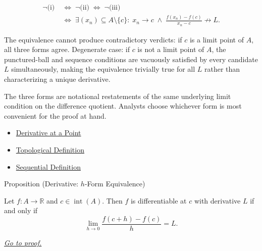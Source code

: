 \begin{remark*}
\[
\begin{aligned}
\neg\text{(i)} &\;\Longleftrightarrow\; \neg\text{(ii)} \;\Longleftrightarrow\; \neg\text{(iii)}\\
&\;\Longleftrightarrow\; \exists (x_n) \subseteq A \setminus \{c\}:\;
x_n \to c \;\land\; \frac{f(x_n)-f(c)}{x_n-c} \not\to L.
\end{aligned}
\]
\end{remark*}

\begin{remark*}
The equivalence cannot produce contradictory verdicts: if $c$ is a limit point of $A$, all three forms agree. Degenerate case: if $c$ is not a limit point of $A$, the punctured-ball and sequence conditions are vacuously satisfied by every candidate $L$ simultaneously, making the equivalence trivially true for all $L$ rather than characterizing a unique derivative.
\end{remark*}

\begin{remark*}[Interpretation]
The three forms are notational restatements of the same underlying limit condition on the difference quotient. Analysts choose whichever form is most convenient for the proof at hand.
\end{remark*}

\begin{dependencies}
\begin{itemize}
  \item \hyperref[def:derivative-at-a-point]{Derivative at a Point}
  \item \hyperref[def:topological-definition-of-derivative-at-a-point]{Topological Definition}
  \item \hyperref[def:sequential-definition-of-derivative-at-a-point]{Sequential Definition}
\end{itemize}
\end{dependencies}


\begin{propositionbox}{Proposition (Derivative: $h$-Form Equivalence)}
\begin{proposition}
\label{prop:derivative-h-form-equivalence}
Let $f : A \to \mathbb{R}$ and $c \in \operatorname{int}(A)$. Then $f$ is differentiable at $c$ with derivative $L$ if and only if
\[
\lim_{h \to 0} \frac{f(c+h) - f(c)}{h} = L.
\]

\smallskip\noindent
\hyperref[prf:derivative-h-form-equivalence]{\textit{Go to proof.}}
\end{proposition}
\end{propositionbox}

